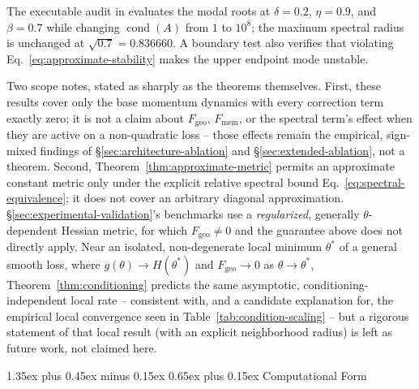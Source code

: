 \documentclass[10pt,twocolumn]{article}
\makeatletter
\renewcommand\section{\@startsection{section}{1}{0pt}%
  {1.35ex plus 0.45ex minus 0.15ex}%
  {0.65ex plus 0.15ex}%
  {\large\bfseries}}
\makeatother
\begin{document}
The executable audit in
 evaluates the modal
roots at $\delta=0.2$, $\eta=0.9$, and $\beta=0.7$ while changing
$\operatorname{cond}(A)$ from $1$ to $10^8$; the maximum spectral radius is
unchanged at $\sqrt{0.7}=0.836660$. A boundary test also verifies that
violating Eq.~\eqref{eq:approximate-stability} makes the upper endpoint mode
unstable.

Two scope notes, stated as sharply as the theorems themselves. First, these results
cover only the base momentum dynamics with every correction term exactly
zero; it is not a claim about $F_{\mathrm{geo}}$, $F_{\mathrm{mem}}$, or the
spectral term's effect when they are active on a non-quadratic loss --
those effects remain the empirical, sign-mixed findings of
\S\ref{sec:architecture-ablation} and \S\ref{sec:extended-ablation}, not a
theorem. Second, Theorem~\ref{thm:approximate-metric} permits an approximate
constant metric only under the explicit relative spectral bound
Eq.~\eqref{eq:spectral-equivalence}; it does not cover an arbitrary diagonal
approximation. \S\ref{sec:experimental-validation}'s benchmarks use a
\emph{regularized}, generally $\theta$-dependent Hessian metric, for which
$F_{\mathrm{geo}}\ne0$ and the guarantee above does not directly apply.
Near an isolated, non-degenerate local minimum $\theta^\ast$ of a general
smooth loss, where $g(\theta)\to H(\theta^\ast)$ and $F_{\mathrm{geo}}\to0$
as $\theta\to\theta^\ast$, Theorem~\ref{thm:conditioning} predicts the same
asymptotic, conditioning-independent local rate -- consistent with, and a
candidate explanation for, the empirical local convergence seen in
Table~\ref{tab:condition-scaling} -- but a rigorous statement of that local
result (with an explicit neighborhood radius) is left as future work, not
claimed here.

\section{Computational Form}
\label{sec:computational-form}
\end{document}
